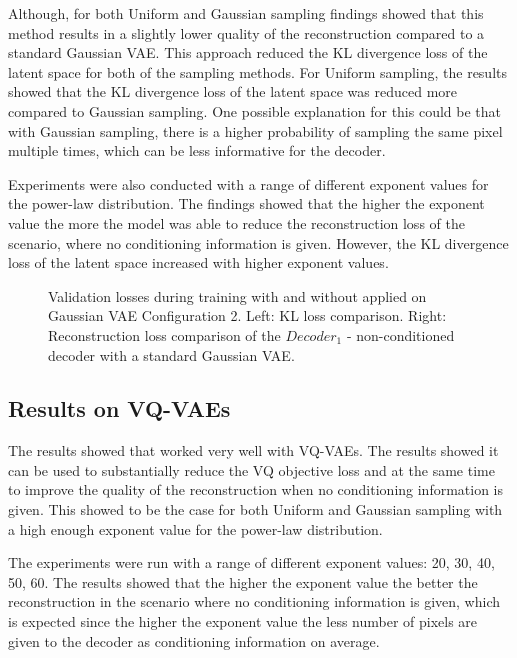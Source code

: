 Although, for both Uniform and Gaussian sampling findings showed that this method results in a slightly lower quality of the reconstruction compared to a standard Gaussian VAE. This approach reduced the KL divergence loss of the latent space for both of the sampling methods. For Uniform sampling, the results showed that the KL divergence loss of the latent space was reduced more compared to Gaussian sampling. One possible explanation for this could be that with Gaussian sampling, there is a higher probability of sampling the same pixel multiple times, which can be less informative for the decoder.

Experiments were also conducted with a range of different exponent values for the power-law distribution. The findings showed that the higher the exponent value the more the model was able to reduce the reconstruction loss of the scenario, where no conditioning information is given. However, the KL divergence loss of the latent space increased with higher exponent values.

\begin{figure}[H]
    \centering
    \scalebox{0.48}{}
    \scalebox{0.48}{}
    \caption[Validation loss during training with  applied on Gaussian VAE.]
    {
        Validation losses during training with and without  applied on Gaussian VAE Configuration 2.
        Left: KL loss comparison. Right: Reconstruction loss comparison of the $Decoder_1$ - non-conditioned decoder with a standard Gaussian VAE.
    }
    \label{fig:results_method2_gaussian_vae}
\end{figure}

\subsection{Results on VQ-VAEs}

The results showed that  worked very well with VQ-VAEs. The results showed it can be used to substantially reduce the VQ objective loss and at the same time to improve the quality of the reconstruction when no conditioning information is given. This showed to be the case for both Uniform and Gaussian sampling with a high enough exponent value for the power-law distribution.

The experiments were run with a range of different exponent values: 20, 30, 40, 50, 60. The results showed that the higher the exponent value the better the reconstruction in the scenario where no conditioning information is given, which is expected since the higher the exponent value the less number of pixels are given to the decoder as conditioning information on average.

